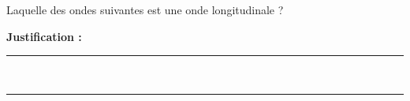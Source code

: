 Laquelle des ondes suivantes est une onde longitudinale ?

\choices

\noindent\textbf{Justification :} \hrulefill \\[2.5ex]
\rule{\linewidth}{0.4pt} \\[2.5ex]
\rule{\linewidth}{0.4pt}
\vfill

